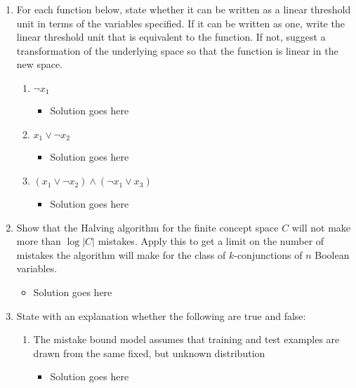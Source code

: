 \documentclass{article}
\begin{document}
\begin{enumerate}
\item For each function below, state whether it can be written as a linear threshold unit in terms of the variables specified. If it can be written as one, write the linear threshold unit that is equivalent to the function. If not, suggest a transformation of the underlying space so that the function is linear in the new space.

	\begin{enumerate}
	\item $\neg x_{1}$
		\begin{itemize}
		\item Solution goes here
		\end{itemize}

	\item $x_{1}\vee \neg x_{2}$
		\begin{itemize}
		\item Solution goes here
		\end{itemize}

	\item $(x_{1}\vee \neg x_{2})\wedge (\neg x_{1} \vee x_{3})$
		\begin{itemize}
		\item Solution goes here
		\end{itemize}

	\end{enumerate}

\item Show that the Halving algorithm for the finite concept space $C$ will not make more than $\log\left| C\right|$ mistakes. Apply this to get a limit on the number of mistakes the algorithm will make for the class of $k$-conjunctions of $n$ Boolean variables.


	\begin{itemize}
	\item Solution goes here
	\end{itemize}



\item State with an explanation whether the following are true and false:
	\begin{enumerate}
	\item The mistake bound model assumes that training and test examples are drawn from the same fixed, but unknown distribution
		\begin{itemize}
		\item Solution goes here
		\end{itemize}


\end{enumerate}
\end{enumerate}
\end{document}
